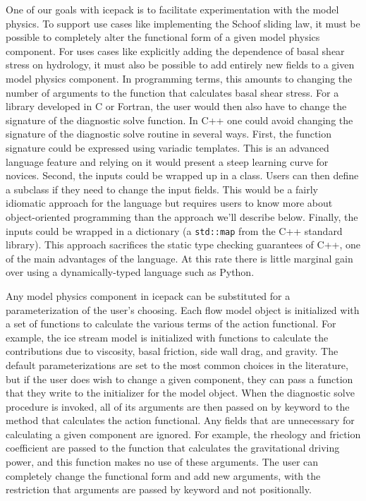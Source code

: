 \documentclass{article}
\theoremstyle{definition}
\theoremstyle{plain}
\begin{document}
One of our goals with icepack is to facilitate experimentation with the model physics.
To support use cases like implementing the Schoof sliding law, it must be possible to completely alter the functional form of a given model physics component.
For uses cases like explicitly adding the dependence of basal shear stress on hydrology, it must also be possible to add entirely new fields to a given model physics component.
In programming terms, this amounts to changing the number of arguments to the function that calculates basal shear stress.
For a library developed in C or Fortran, the user would then also have to change the signature of the diagnostic solve function.
In C++ one could avoid changing the signature of the diagnostic solve routine in several ways.
First, the function signature could be expressed using variadic templates.
This is an advanced language feature and relying on it would present a steep learning curve for novices.
Second, the inputs could be wrapped up in a class.
Users can then define a subclass if they need to change the input fields.
This would be a fairly idiomatic approach for the language but requires users to know more about object-oriented programming than the approach we'll describe below.
Finally, the inputs could be wrapped in a dictionary (a \texttt{std::map} from the C++ standard library).
This approach sacrifices the static type checking guarantees of C++, one of the main advantages of the language.
At this rate there is little marginal gain over using a dynamically-typed language such as Python.

Any model physics component in icepack can be substituted for a parameterization of the user's choosing.
Each flow model object is initialized with a set of functions to calculate the various terms of the action functional.
For example, the ice stream model is initialized with functions to calculate the contributions due to viscosity, basal friction, side wall drag, and gravity.
The default parameterizations are set to the most common choices in the literature, but if the user does wish to change a given component, they can pass a function that they write to the initializer for the model object.
When the diagnostic solve procedure is invoked, all of its arguments are then passed on by keyword to the method that calculates the action functional.
Any fields that are unnecessary for calculating a given component are ignored.
For example, the rheology and friction coefficient are passed to the function that calculates the gravitational driving power, and this function makes no use of these arguments.
The user can completely change the functional form and add new arguments, with the restriction that arguments are passed by keyword and not positionally.
\end{document}
